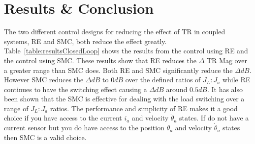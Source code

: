 \section{Results \& Conclusion}\label{sec:con}
% 
The two different control designs for reducing the effect of TR in coupled systems, RE and SMC, both reduce the effect greatly. Table~\ref{table:resultsClosedLoop} shows the results from the control using RE and the control using SMC. 
These results show that RE reduces the $\Delta$ TR Mag over a greater range than SMC does. 
Both RE and SMC significantly reduce the $\Delta dB$.  
However SMC reduces the $\Delta dB$ to $0dB$ over the defined ratios of $J_L:J_a$ while RE continues to have the switching effect causing a $\Delta dB$ around $0.5dB$. 
It has also been shown that the SMC is effective for dealing with the load switching over a range of $J_L:J_a$ ratios.  
The performance and simplicity of RE makes it a good choice if you have access to the current $i_a$ and velocity $\dot{\theta}_a$ states. 
If do not have a current sensor but you do have access to the position $\theta_a$ and velocity $\dot{\theta}_a$ states then SMC is a valid choice.  